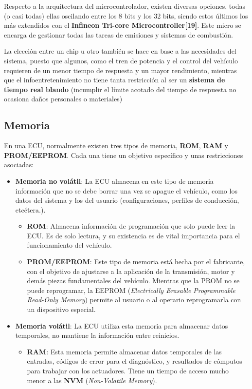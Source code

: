 Respecto a la arquitectura del microcontrolador, existen diversas opciones, todas (o casi todas) ellas oscilando entre los 8 bits y los 32 bits, siendo estos últimos los más extendidos con el \textbf{Infineon Tri-core Microcontroller[19]}. Este micro se encarga de gestionar todas las tareas de emisiones y sistemas de combustión. 

La elección entre un chip u otro también se hace en base a las necesidades del sistema, puesto que algunos, como el tren de potencia y el control del vehículo requieren de un menor tiempo de respuesta y un mayor rendimiento, mientras que el infoentretenimiento no tiene tanta restricción al ser un \textbf{sistema de tiempo real blando} (incumplir el límite acotado del tiempo de respuesta no ocasiona daños personales o materiales)

\subsection{Memoria}

En una ECU, normalmente existen tres tipos de memoria, \textbf{ROM}, \textbf{RAM} y \textbf{PROM/EEPROM}. Cada una tiene un objetivo específico y unas restricciones asociadas:

\begin{itemize}
    \item \textbf{Memoria no volátil}: La ECU almacena en este tipo de memoria información que no se debe borrar una vez se apague el vehículo, como los datos del sistema y los del usuario (configuraciones, perfiles de conducción, etcétera.).
    \begin{itemize}
        \item \textbf{ROM}: Almacena información de programación que solo puede leer la ECU. Es de solo lectura, y su existencia es de vital importancia para el funcionamiento del vehículo.
        \item \textbf{PROM/EEPROM}: Este tipo de memoria está hecha por el fabricante, con el objetivo de ajustarse a la aplicación de la transmisión, motor y demás piezas fundamentales del vehículo. Mientras que la PROM no se puede reprogramar, la EEPROM (\textit{Electrically Erasable Programmable Read-Only Memory}) permite al usuario o al operario reprogramarla con un dispositivo especial. 
    \end{itemize}
    \item \textbf{Memoria volátil}: La ECU utiliza esta memoria para almacenar datos temporales, no mantiene la información entre reinicios.
    \begin{itemize}
        \item \textbf{RAM}: Esta memoria permite almacenar datos temporales de las entradas, códigos de error para el diagnóstico, y resultados de cómputos para trabajar con los actuadores. Tiene un tiempo de acceso mucho menor a las \textbf{NVM} (\textit{Non-Volatile Memory}).
    \end{itemize}
\end{itemize}

